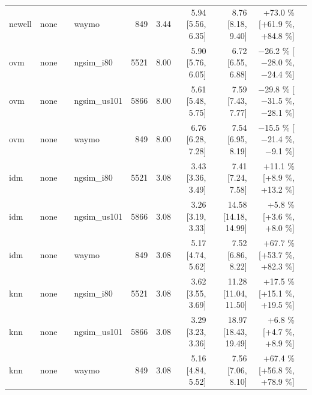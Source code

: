 \begin{table}[htbp]
{\begin{tabular}{llrlrrrrrr}
newell & none &  & waymo & 849 & 3.44 & 5.94 [5.56, 6.35] & 8.76 [8.18, 9.40] & +73.0 \% [+61.9 \%, +84.8 \%] &  \\
ovm & none &  & ngsim\_i80 & 5521 & 8.00 & 5.90 [5.76, 6.05] & 6.72 [6.55, 6.88] & $-$26.2 \% [$-$28.0 \%, $-$24.4 \%] &  \\
ovm & none &  & ngsim\_us101 & 5866 & 8.00 & 5.61 [5.48, 5.75] & 7.59 [7.43, 7.77] & $-$29.8 \% [$-$31.5 \%, $-$28.1 \%] &  \\
ovm & none &  & waymo & 849 & 8.00 & 6.76 [6.28, 7.28] & 7.54 [6.95, 8.19] & $-$15.5 \% [$-$21.4 \%, $-$9.1 \%] &  \\
idm & none &  & ngsim\_i80 & 5521 & 3.08 & 3.43 [3.36, 3.49] & 7.41 [7.24, 7.58] & +11.1 \% [+8.9 \%, +13.2 \%] &  \\
idm & none &  & ngsim\_us101 & 5866 & 3.08 & 3.26 [3.19, 3.33] & 14.58 [14.18, 14.99] & +5.8 \% [+3.6 \%, +8.0 \%] &  \\
idm & none &  & waymo & 849 & 3.08 & 5.17 [4.74, 5.62] & 7.52 [6.86, 8.22] & +67.7 \% [+53.7 \%, +82.3 \%] &  \\
knn & none &  & ngsim\_i80 & 5521 & 3.08 & 3.62 [3.55, 3.69] & 11.28 [11.04, 11.50] & +17.5 \% [+15.1 \%, +19.5 \%] &  \\
knn & none &  & ngsim\_us101 & 5866 & 3.08 & 3.29 [3.23, 3.36] & 18.97 [18.43, 19.49] & +6.8 \% [+4.7 \%, +8.9 \%] &  \\
knn & none &  & waymo & 849 & 3.08 & 5.16 [4.84, 5.52] & 7.56 [7.06, 8.10] & +67.4 \% [+56.8 \%, +78.9 \%] &  \\
\bottomrule
\end{tabular}
}
\end{table}
